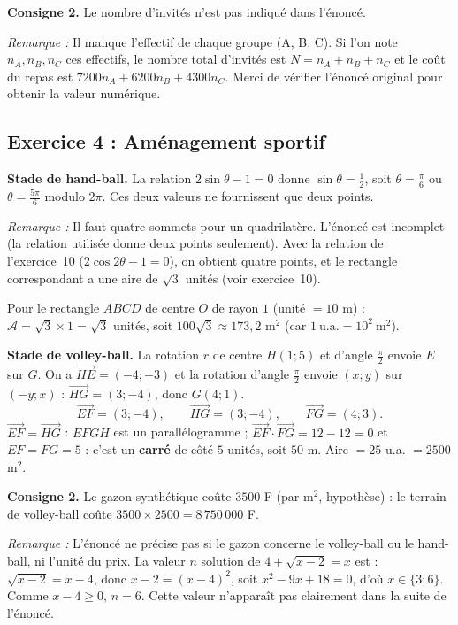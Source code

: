 \documentclass[11pt,a4paper]{article}
\newcommand{\vect}[1]{\overrightarrow{#1}}
\newenvironment{rem}{\par\medskip\noindent\textit{Remarque :}\quad}{\par\medskip}
\begin{document}
\medskip\noindent\textbf{Consigne 2.} Le nombre d'invit\'es n'est pas indiqu\'e dans l'\'enonc\'e.
\begin{rem} Il manque l'effectif de chaque groupe (A, B, C). Si l'on note $n_A,n_B,n_C$ ces effectifs, le nombre total
d'invit\'es est $N=n_A+n_B+n_C$ et le co\^ut du repas est $7200n_A+6200n_B+4300n_C$.
Merci de v\'erifier l'\'enonc\'e original pour obtenir la valeur num\'erique.\end{rem}

\subsection{Exercice 4 : Am\'enagement sportif}

\textbf{Stade de hand-ball.} La relation $2\sin\theta-1=0$ donne $\sin\theta=\frac12$, soit
$\theta=\frac{\pi}{6}$ ou $\theta=\frac{5\pi}{6}$ modulo $2\pi$. Ces deux valeurs ne fournissent que deux points.
\begin{rem} Il faut quatre sommets pour un quadrilat\`ere. L'\'enonc\'e est incomplet (la relation utilis\'ee
donne deux points seulement). Avec la relation de l'exercice~10 ($2\cos2\theta-1=0$), on obtient quatre points,
et le rectangle correspondant a une aire de $\sqrt3$ unit\'es (voir exercice~10).
\end{rem}
Pour le rectangle $ABCD$ de centre $O$ de rayon $1$ (unit\'e $=10$ m) :
$\mathcal A=\sqrt3\times 1=\sqrt3$ unit\'es, soit $100\sqrt3\approx 173{,}2$ m$^2$ (car $1\ \text{u.a.}=10^2\ \text{m}^2$).

\textbf{Stade de volley-ball.} La rotation $r$ de centre $H(1;5)$ et d'angle $\frac{\pi}{2}$ envoie $E$ sur $G$.
On a $\vect{HE}=(-4;-3)$ et la rotation d'angle $\frac{\pi}{2}$ envoie $(x;y)$ sur $(-y;x)$ :
$\vect{HG}=(3;-4)$, donc $G(4;1)$.
\[
\vect{EF}=(3;-4),\qquad \vect{HG}=(3;-4),\qquad \vect{FG}=(4;3).
\]
$\vect{EF}=\vect{HG}$ : $EFGH$ est un parall\'elogramme ; $\vect{EF}\cdot\vect{FG}=12-12=0$ et $EF=FG=5$ :
c'est un \textbf{carr\'e} de c\^ot\'e $5$ unit\'es, soit $50$ m. Aire $=25$ u.a. $=2500$ m$^2$.

\medskip\noindent\textbf{Consigne 2.} Le gazon synthétique co\^ute $3500$ F (par m$^2$, hypoth\`ese) :
le terrain de volley-ball co\^ute $3500\times2500=8\,750\,000$ F.
\begin{rem} L'\'enonc\'e ne pr\'ecise pas si le gazon concerne le volley-ball ou le hand-ball, ni l'unit\'e du prix.
La valeur $n$ solution de $4+\sqrt{x-2}=x$ est : $\sqrt{x-2}=x-4$, donc $x-2=(x-4)^2$, soit $x^2-9x+18=0$, d'o\`u $x\in\{3;6\}$.
Comme $x-4\ge 0$, $n=6$. Cette valeur n'appara\^it pas clairement dans la suite de l'\'enonc\'e.\end{rem}
\end{document}
